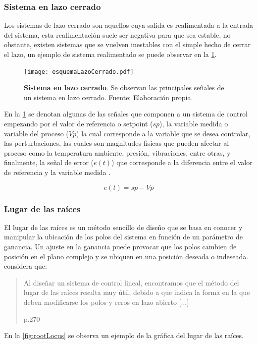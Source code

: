         \subsubsection{Sistema en lazo cerrado}
		
			Los sistemas de lazo cerrado son aquellos cuya salida es realimentada a la entrada del sistema, esta realimentación suele ser negativa para que sea estable, no obstante, existen sistemas que se vuelven inestables con el simple hecho de cerrar el lazo, un ejemplo de sistema realimentado se puede observar en la \cref{fig:esquemaLazoCerrado}.
			
			\begin{figure}[htb]
				\centering
				\texttt{[image: esquemaLazoCerrado.pdf]}
				\caption[Ejemplo de un sistema en lazo cerrado]{\textbf{Sistema en lazo cerrado}. Se observan las principales señales de un sistema en lazo cerrado. Fuente: Elaboración propia.} 
				\label{fig:esquemaLazoCerrado}
			\end{figure}
			
            En la \cref{fig:esquemaLazoCerrado} se denotan algunas de las señales que componen a un sistema de control empezando por el valor de referencia o setpoint ($sp$), la variable medida o variable del proceso ($Vp$) la cual corresponde a la variable que se desea controlar, las perturbaciones, las cuales son magnitudes físicas que pueden afectar al proceso como la temperatura ambiente, presión, vibraciones, entre otras, y finalmente, la señal de error ($e(t)$) que corresponde a la diferencia entre el valor de referencia y la variable medida \Parencite{maloney2006electronica}.
            
            \begin{equation}\label{eq:Serror}
				e(t) = sp - Vp
            \end{equation}
        
        \subsubsection{Lugar de las raíces}
            
            El lugar de las raíces es un método sencillo de diseño que se basa en conocer y manipular la ubicación de los polos del sistema en función de un parámetro de ganancia. Un ajuste en la ganancia puede provocar que los polos cambien de posición en el plano complejo y se ubiquen en una posición deseada o indeseada. \textcite{ogata2003ingenieria} considera que: \blockquote[p.270]{Al diseñar un sistema de control lineal, encontramos que el método del lugar de las raíces resulta muy útil, debido a que indica la forma en la que deben modificarse los polos y ceros en lazo abierto [...]}. En la \cref{fig:rootLocus} se observa un ejemplo de la gráfica del lugar de las raíces.

